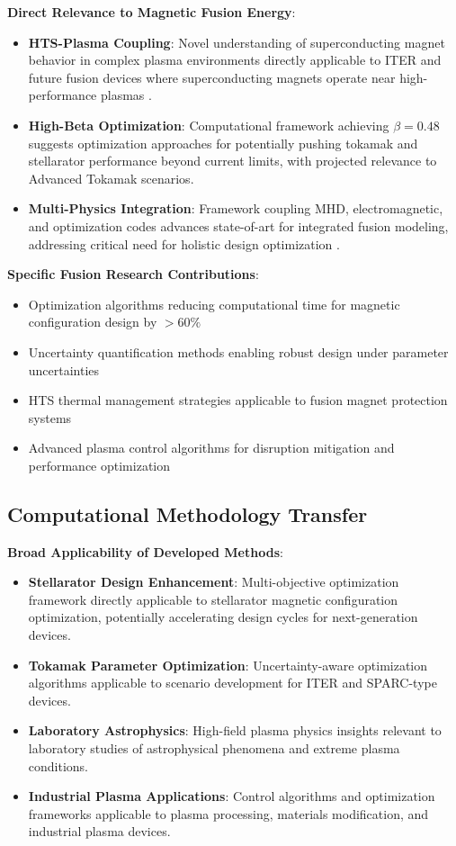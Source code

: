\documentclass[10pt,twocolumn]{article}
\begin{document}
\textbf{Direct Relevance to Magnetic Fusion Energy}:
\begin{itemize}
\item \textbf{HTS-Plasma Coupling}: Novel understanding of superconducting magnet behavior in complex plasma environments directly applicable to ITER and future fusion devices where superconducting magnets operate near high-performance plasmas \cite{senatore2014progress}.
\item \textbf{High-Beta Optimization}: Computational framework achieving $\beta = 0.48$ suggests optimization approaches for potentially pushing tokamak and stellarator performance beyond current limits, with projected relevance to Advanced Tokamak scenarios.
\item \textbf{Multi-Physics Integration}: Framework coupling MHD, electromagnetic, and optimization codes advances state-of-art for integrated fusion modeling, addressing critical need for holistic design optimization \cite{PlasmaPhysics2023}.
\end{itemize}

\textbf{Specific Fusion Research Contributions}:
\begin{itemize}
\item Optimization algorithms reducing computational time for magnetic configuration design by $>60\%$
\item Uncertainty quantification methods enabling robust design under parameter uncertainties
\item HTS thermal management strategies applicable to fusion magnet protection systems
\item Advanced plasma control algorithms for disruption mitigation and performance optimization
\end{itemize}

\subsection{Computational Methodology Transfer}

\textbf{Broad Applicability of Developed Methods}:
\begin{itemize}
\item \textbf{Stellarator Design Enhancement}: Multi-objective optimization framework directly applicable to stellarator magnetic configuration optimization, potentially accelerating design cycles for next-generation devices.
\item \textbf{Tokamak Parameter Optimization}: Uncertainty-aware optimization algorithms applicable to scenario development for ITER and SPARC-type devices.
\item \textbf{Laboratory Astrophysics}: High-field plasma physics insights relevant to laboratory studies of astrophysical phenomena and extreme plasma conditions.
\item \textbf{Industrial Plasma Applications}: Control algorithms and optimization frameworks applicable to plasma processing, materials modification, and industrial plasma devices.
\end{itemize}
\end{document}
